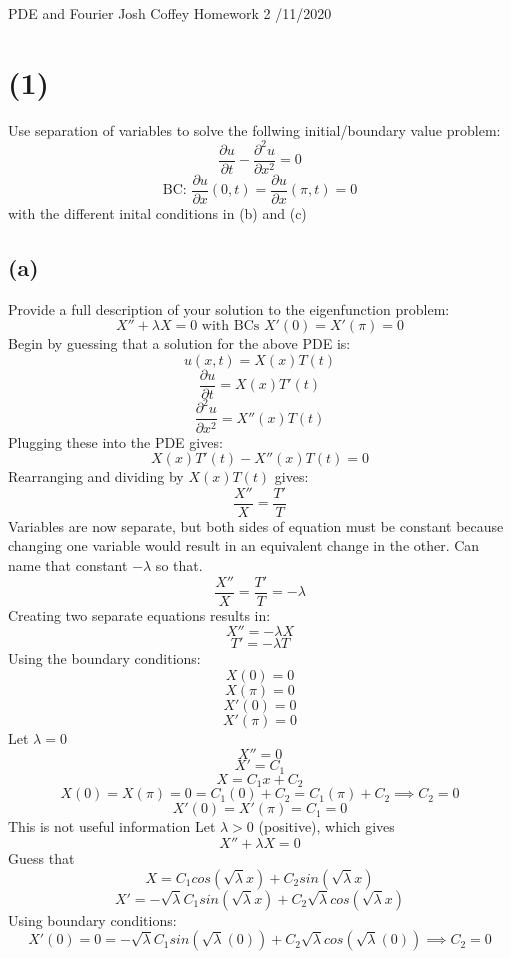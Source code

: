 \documentclass[preview,12pt]{article}
\begin{document}
\noindent PDE and Fourier\newline
Josh Coffey \newline
Homework 2 /11/2020 \newline

\section*{(1)}
    Use separation of variables to solve the follwing initial/boundary value problem:
    $$\frac{\partial u}{\partial t}-\frac{\partial^2 u}{\partial x^2}=0$$
    $$\textrm{BC: }\frac{\partial u}{\partial x}(0,t)=\frac{\partial u}{\partial x}(\pi,t)=0$$
    with the different inital conditions in (b) and (c)
    \subsection*{(a)}
        Provide a full description of your solution to the eigenfunction problem:
        $$X''+\lambda X=0 \textrm{ with BCs } X'(0)=X'(\pi)=0$$
        Begin by guessing that a solution for the above PDE is:
        $$u(x,t)=X(x)T(t)$$
        $$\frac{\partial u}{\partial t}=X(x)T'(t)$$
        $$\frac{\partial^2u}{\partial x^2}=X''(x)T(t)$$
        Plugging these into the PDE gives: 
        $$X(x)T'(t)-X''(x)T(t)=0$$
        Rearranging and dividing by $X(x)T(t)$ gives:
        $$\frac{X''}{X}=\frac{T'}{T}$$
        Variables are now separate, but both sides of equation must be constant because changing one variable would result in an equivalent change in the other.  Can name that constant $-\lambda$ so that.
        $$\frac{X''}{X}=\frac{T'}{T}=-\lambda$$
        Creating two separate equations results in:
        $$X''=-\lambda X$$
        $$T'=-\lambda T$$
        Using the boundary conditions:
        $$X(0)=0$$
        $$X(\pi)=0$$
        $$X'(0)=0$$
        $$X'(\pi)=0$$
        Let $\lambda=0$
        $$X''=0$$
        $$X'=C_1$$
        $$X=C_1x+C_2$$
        $$X(0)=X(\pi)=0=C_1(0)+C_2=C_1(\pi)+C_2 \implies C_2=0$$
        $$X'(0)=X'(\pi)=C_1=0$$
        This is not useful information \newline
        Let $\lambda>0$ (positive), which gives
        $$X''+\lambda X=0$$
        Guess that 
        $$X=C_1cos(\sqrt{\lambda}x)+C_2sin(\sqrt{\lambda}x)$$
        $$X'=-\sqrt{\lambda}C_1sin(\sqrt{\lambda}x)+C_2\sqrt{\lambda}cos(\sqrt{\lambda}x)$$
        Using boundary conditions:
        $$X'(0)=0=-\sqrt{\lambda}C_1sin(\sqrt{\lambda}(0))+C_2\sqrt{\lambda}cos(\sqrt{\lambda}(0)) \implies C_2=0$$
\end{document}
